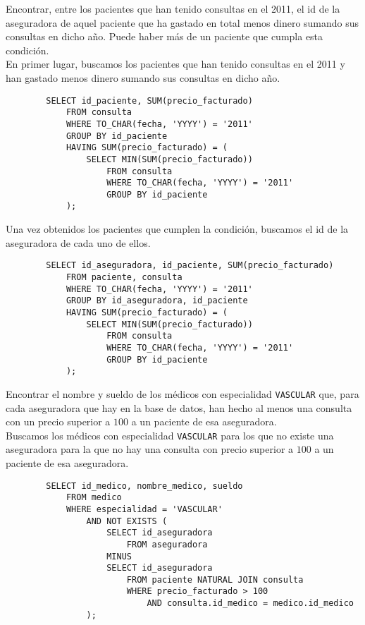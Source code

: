 \documentclass[12pt]{article}
\begin{document}
\begin{ejercicio}[SQL]
    Encontrar, entre los pacientes que han tenido consultas en el 2011, el id de la aseguradora de aquel paciente que ha gastado en total menos dinero sumando sus consultas en dicho año. Puede haber más de un paciente que cumpla esta condición.\\

    En primer lugar, buscamos los pacientes que han tenido consultas en el 2011 y han gastado menos dinero sumando sus consultas en dicho año.
    \begin{verbatim}
        SELECT id_paciente, SUM(precio_facturado)
            FROM consulta
            WHERE TO_CHAR(fecha, 'YYYY') = '2011'
            GROUP BY id_paciente
            HAVING SUM(precio_facturado) = (
                SELECT MIN(SUM(precio_facturado))
                    FROM consulta
                    WHERE TO_CHAR(fecha, 'YYYY') = '2011'
                    GROUP BY id_paciente
            );
    \end{verbatim}

    Una vez obtenidos los pacientes que cumplen la condición, buscamos el id de la aseguradora de cada uno de ellos.
    \begin{verbatim}
        SELECT id_aseguradora, id_paciente, SUM(precio_facturado)
            FROM paciente, consulta
            WHERE TO_CHAR(fecha, 'YYYY') = '2011'
            GROUP BY id_aseguradora, id_paciente
            HAVING SUM(precio_facturado) = (
                SELECT MIN(SUM(precio_facturado))
                    FROM consulta
                    WHERE TO_CHAR(fecha, 'YYYY') = '2011'
                    GROUP BY id_paciente
            );
    \end{verbatim}
\end{ejercicio}

\begin{ejercicio}[SQL]
    Encontrar el nombre y sueldo de los médicos con especialidad \verb|VASCULAR| que, para cada aseguradora que hay en la base de datos, han hecho al menos una consulta con un precio superior a $100$ a un paciente de esa aseguradora.\\

    Buscamos los médicos con especialidad \verb|VASCULAR| para los que no existe una aseguradora para la que no hay una consulta con precio superior a $100$ a un paciente de esa aseguradora.
    \begin{verbatim}
        SELECT id_medico, nombre_medico, sueldo
            FROM medico
            WHERE especialidad = 'VASCULAR'
                AND NOT EXISTS (
                    SELECT id_aseguradora
                        FROM aseguradora
                    MINUS
                    SELECT id_aseguradora
                        FROM paciente NATURAL JOIN consulta
                        WHERE precio_facturado > 100
                            AND consulta.id_medico = medico.id_medico
                );
    \end{verbatim}
\end{ejercicio}
\end{document}
